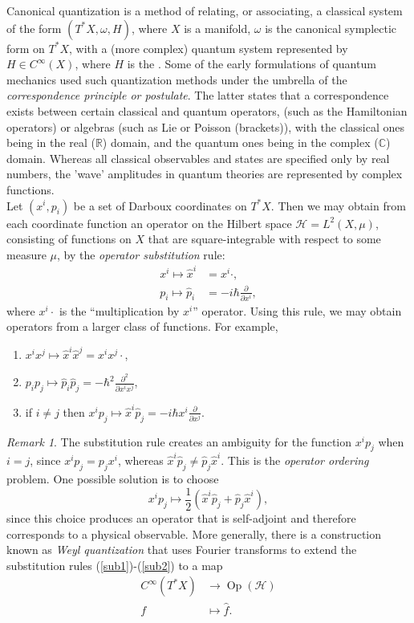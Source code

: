 \documentclass[12pt]{article}
\theoremstyle{definition}
\theoremstyle{remark}
\newtheorem*{rmk}{Remark}
\newcommand{\pdiff}[2]{\frac{\partial #1}{\partial #2}}
\DeclareMathOperator{\Op}{Op}
\begin{document}
Canonical quantization is a method of relating, or associating, a classical system of the form $(T^*X, \omega, H)$, where $X$ is a manifold, $\omega$ is the canonical symplectic form on $T^*X$, with a (more complex) quantum system represented by $H \in C^\infty(X)$, where $H$ is the 
. Some of the early formulations of quantum mechanics used such quantization methods under the umbrella of the \emph{correspondence principle or postulate}.
The latter states that a correspondence exists between certain classical and quantum operators,
(such as the Hamiltonian operators) or algebras (such as Lie or Poisson (brackets)), with the
classical ones being in the real ($\mathbb{R}$) domain, and the quantum ones being in the complex ($\mathbb{C}$) domain.
Whereas all classical observables and states are specified only by real numbers, the 'wave' amplitudes in quantum
theories are represented by complex functions. \\

Let $(x^i, p_i)$ be a set of Darboux coordinates on $T^*X$. Then we may obtain from each coordinate function an operator on the Hilbert space $\mathcal{H} = L^2(X, \mu)$, consisting of functions on $X$ that are square-integrable with respect to some measure $\mu$, by the \emph{operator substitution} rule:
\begin{align}
x^i \mapsto \hat{x}^i &= x^i \cdot, \label{sub1}\\
p_i \mapsto \hat{p}_i &= -i \hbar \pdiff{}{x^i} \label{sub2},
\end{align}
where $x^i \cdot$ is the ``multiplication by $x^i$'' operator.  Using this rule, we may obtain operators from a larger class of functions.  For example,
\begin{enumerate}
\item $x^i x^j \mapsto \hat{x}^i \hat{x}^j = x^i x^j \cdot$,
\item $p_i p_j \mapsto \hat{p}_i \hat{p}_j = -\hbar^2 \pdiff{^2}{x^i x^j}$,
\item if $i \neq j$ then $x^i p_j \mapsto \hat{x}^i \hat{p}_j = -i \hbar x^i \pdiff{}{x^j}$.
\end{enumerate}

\begin{rmk}
The substitution rule creates an ambiguity for the function $x^i p_j$ when $i=j$, since $x^i p_j = p_j x^i$, whereas $\hat{x}^i \hat{p}_j \neq \hat{p}_j \hat{x}^i$.  This is the \emph{operator ordering} problem.  One possible solution is to choose 
\begin{equation*}x^i p_j \mapsto \frac{1}{2}\left(\hat{x}^i \hat{p}_j + \hat{p}_j \hat{x}^i\right),\end{equation*}
since this choice produces an operator that is self-adjoint and therefore corresponds to a physical observable.  More generally, there is a construction known as \emph{Weyl quantization} that uses Fourier transforms to extend the substitution rules (\ref{sub1})-(\ref{sub2}) to a map
\begin{align*}
C^\infty(T^*X) &\to \Op (\mathcal{H}) \\
f &\mapsto \hat{f}.
\end{align*}
\end{rmk}
\end{document}

